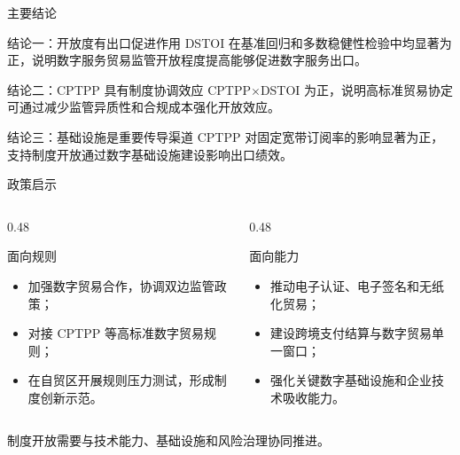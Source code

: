 \documentclass[aspectratio=169,10pt]{ctexbeamer}
\begin{document}
\begin{frame}{主要结论}
  \begin{block}{结论一：开放度有出口促进作用}
    DSTOI 在基准回归和多数稳健性检验中均显著为正，说明数字服务贸易监管开放程度提高能够促进数字服务出口。
  \end{block}
  \begin{block}{结论二：CPTPP 具有制度协调效应}
    CPTPP$\times$DSTOI 为正，说明高标准贸易协定可通过减少监管异质性和合规成本强化开放效应。
  \end{block}
  \begin{block}{结论三：基础设施是重要传导渠道}
    CPTPP 对固定宽带订阅率的影响显著为正，支持制度开放通过数字基础设施建设影响出口绩效。
  \end{block}
\end{frame}

\begin{frame}{政策启示}
  \begin{columns}[T,totalwidth=\textwidth]
    \begin{column}{0.48\textwidth}
      \begin{block}{面向规则}
        \begin{itemize}
          \item 加强数字贸易合作，协调双边监管政策；
          \item 对接 CPTPP 等高标准数字贸易规则；
          \item 在自贸区开展规则压力测试，形成制度创新示范。
        \end{itemize}
      \end{block}
    \end{column}
    \begin{column}{0.48\textwidth}
      \begin{block}{面向能力}
        \begin{itemize}
          \item 推动电子认证、电子签名和无纸化贸易；
          \item 建设跨境支付结算与数字贸易单一窗口；
          \item 强化关键数字基础设施和企业技术吸收能力。
        \end{itemize}
      \end{block}
    \end{column}
  \end{columns}
  \vspace{0.5em}
  \begin{center}
    \large \textcolor{XJTUBlue}{制度开放需要与技术能力、基础设施和风险治理协同推进。}
  \end{center}
\end{frame}
\end{document}
